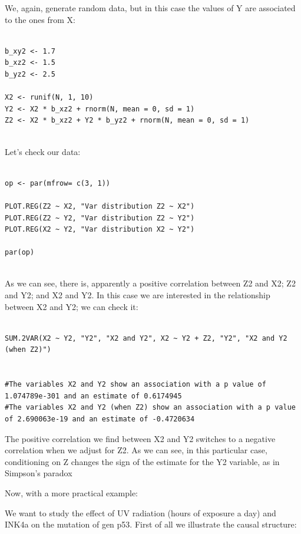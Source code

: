 \documentclass{article}
\begin{document}
We, again, generate random data, but in this case the values of Y are associated to the ones from X:


\begin{lstlisting}

b_xy2 <- 1.7 
b_xz2 <- 1.5
b_yz2 <- 2.5

X2 <- runif(N, 1, 10)
Y2 <- X2 * b_xz2 + rnorm(N, mean = 0, sd = 1)
Z2 <- X2 * b_xz2 + Y2 * b_yz2 + rnorm(N, mean = 0, sd = 1)


\end{lstlisting}

Let's check our data:


\begin{lstlisting}

op <- par(mfrow= c(3, 1))

PLOT.REG(Z2 ~ X2, "Var distribution Z2 ~ X2")
PLOT.REG(Z2 ~ Y2, "Var distribution Z2 ~ Y2")
PLOT.REG(X2 ~ Y2, "Var distribution X2 ~ Y2")

par(op)


\end{lstlisting}





As we can see, there is, apparently a positive correlation between Z2 and X2;   Z2 and Y2; and X2 and Y2. In this case we are interested in the relationship between X2 and Y2; we can check it: 


\begin{lstlisting}

SUM.2VAR(X2 ~ Y2, "Y2", "X2 and Y2", X2 ~ Y2 + Z2, "Y2", "X2 and Y2 (when Z2)")


#The variables X2 and Y2 show an association with a p value of 1.074789e-301 and an estimate of 0.6174945 
#The variables X2 and Y2 (when Z2) show an association with a p value of 2.690063e-19 and an estimate of -0.4720634 

\end{lstlisting}


The positive correlation we find between X2 and Y2 switches to a negative correlation when we adjust for Z2. As we can see, in this particular case, conditioning on Z changes the sign of the estimate for the Y2 variable, as in Simpson's paradox


Now, with a more practical example: 

We want to study the effect of UV radiation (hours of exposure a day) and INK4a on the mutation of gen p53. First of all we illustrate the causal structure:
\end{document}
